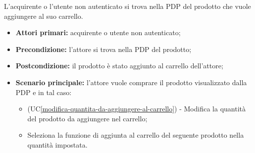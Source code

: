 
\label{aggiunta-carrello-pdp}

L'acquirente o l'utente non autenticato si trova nella PDP del prodotto che vuole aggiungere al suo carrello.
\begin{itemize}
    \item \textbf{Attori primari:} acquirente o utente non autenticato;
    \item \textbf{Precondizione:} l'attore si trova nella PDP del prodotto;
    \item \textbf{Postcondizione:} il prodotto è stato aggiunto al carrello dell'attore;
    \item \textbf{Scenario principale:} l'attore vuole comprare il prodotto visualizzato dalla PDP e in tal caso:
    \begin{itemize}
        \item (UC\ref{modifica-quantita-da-aggiungere-al-carrello}) - Modifica la quantità del prodotto da aggiungere nel carrello;
        \item Seleziona la funzione di aggiunta al carrello del seguente prodotto nella quantità impostata.
    \end{itemize}
\end{itemize}


\label{modifica-quantita-da-aggiungere-al-carrello}

